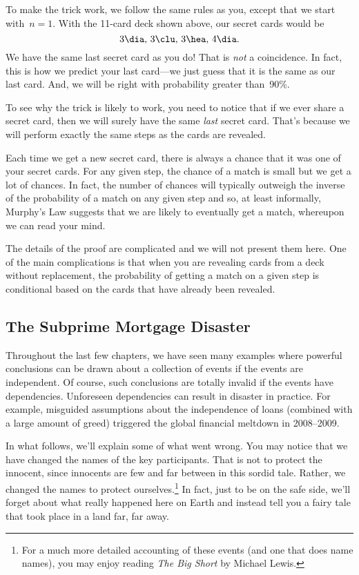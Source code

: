 To make the trick work, we follow the same rules as you, except that we
start with~$n = 1$.  With the 11-card deck shown above, our secret
cards would be
\begin{equation*}
    3\dia, \, 3\clu, \, 3\hea, \, 4\dia.
\end{equation*}
We have the same last secret card as you do!  That is \emph{not} a
coincidence.  In fact, this is how we predict your last card---we just
guess that it is the same as our last card.  And, we will be right
with probability greater than~90\%.

To see why the trick is likely to work, you need to notice that if we
ever share a secret card, then we will surely have the same
\emph{last} secret card.  That's because we will perform exactly the
same steps as the cards are revealed.

Each time we get a new secret card, there is always a chance that it
was one of your secret cards.  For any given step, the chance of a
match is small but we get a lot of chances.  In fact, the number of
chances will typically outweigh the inverse of the probability of a
match on any given step and so, at least informally, Murphy's Law
suggests that we are likely to eventually get a match, whereupon we
can read your mind.

The details of the proof are complicated and we will not present them
here.  One of the main complications is that when you are revealing
cards from a deck without replacement, the probability of getting a
match on a given step is conditional based on the cards that have
already been revealed.

\subsection{The Subprime Mortgage Disaster}\label{sec:subprime}

Throughout the last few chapters, we have seen many examples where
powerful conclusions can be drawn about a collection of events if the
events are independent.  Of course, such conclusions are totally
invalid if the events have dependencies.  Unforeseen dependencies can
result in disaster in practice.  For example, misguided assumptions
about the independence of loans (combined with a large amount of
greed) triggered the global financial meltdown in 2008--2009.

In what follows, we'll explain some of what went wrong.  You may
notice that we have changed the names of the key participants.  That
is not to protect the innocent, since innocents are few and far
between in this sordid tale.  Rather, we changed the names to protect
ourselves.\footnote{For a much more detailed accounting of these
  events (and one that does name names), you may enjoy reading
  \emph{The Big Short} by Michael Lewis.}  In fact, just to be on the
safe side, we'll forget about what really happened here on Earth and
instead tell you a fairy tale that took place in a land far, far away.

